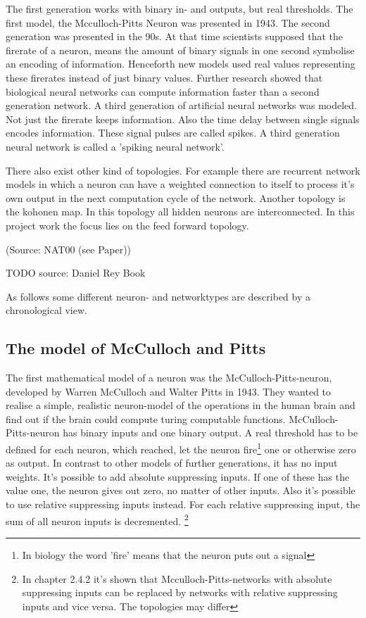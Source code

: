 \documentclass[10pt,a4paper,DIV=11]{scrreprt}
\begin{document}
The first generation works with binary in- and outputs, but real thresholds. The first model, the Mcculloch-Pitts Neuron was presented in 1943.
The second generation was presented in the 90s. At that time scientists supposed that the firerate of a neuron, means the amount of binary signals in one second symbolise an encoding of information. Henceforth new models used real values representing these firerates instead of just binary values.
Further research showed that biological neural networks can compute information faster than a second generation network.
A third generation of artificial neural networks was modeled. Not just the firerate keeps information. Also the time delay between single signals encodes information. These signal pulses are called spikes. A third generation neural network is called a 'spiking neural network'.

There also exist other kind of topologies. For example there are recurrent network models in which a neuron can have a weighted connection to itself to process it's own output in the next computation cycle of the network. Another topology is the kohonen map. In this topology all hidden neurons are interconnected. In this project work the focus lies on the feed forward topology.

 (Source: NAT00 (see Paper))


TODO source: Daniel Rey Book





As follows some different neuron- and networktypes are described by a chronological view.
\subsection{The model of McCulloch and Pitts}
\label{sec:pitts}
The first mathematical model of a neuron was the McCulloch-Pitts-neuron,
developed by Warren McCulloch and Walter Pitts in 1943.\cite{NEURONMATH}
They wanted to realise a simple, realistic neuron-model of the operations in the human brain and find out if the brain could compute turing computable functions.
McCulloch-Pitts-neuron has binary inputs and one binary output.
A real threshold has to be defined for each neuron, which reached, let the neuron fire\footnote{In biology the word 'fire' means that the neuron puts out a signal} one or otherwise zero as output.
In contrast to other models of further generations, it has no input weights.
It's possible to add absolute suppressing inputs. If one of these has the value one, the neuron gives out zero, no matter of other inputs.
Also it's possible to use relative suppressing inputs instead. For each relative suppressing input, the sum of all neuron inputs is decremented.
\footnote{In \cite{rojas} chapter 2.4.2 it's shown that Mcculloch-Pitts-networks with absolute suppressing inputs can be replaced by networks with relative suppressing inputs and vice versa. The topologies may differ}
\end{document}
